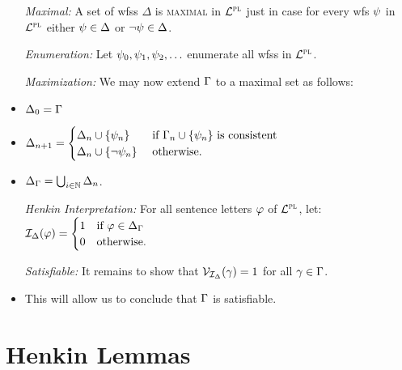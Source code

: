 \documentclass[a4paper, 11pt]{article} %
\begin{document}
\begin{itemize}
  \item[\it Maximal:] A set of wfss $\Delta$ is \textsc{maximal} in $\mathcal{L}^{\textsc{pl}}$ just in case for every wfs $\psi$ in $\mathcal{L}^{\textsc{pl}}$ either $\psi\in\Delta$ or $\neg\psi\in\Delta$.
  \item[\it Enumeration:] Let $\psi_0,\psi_1,\psi_2,\ldots$ enumerate all wfss in $\mathcal{L}^{\textsc{pl}}$.
  \item[\it Maximization:] We may now extend $\Gamma$ to a maximal set as follows: 
    \item $\Delta_0 = \Gamma$
    \item $\Delta_{n+1} =
      \begin{cases}
        \Delta_n\cup\lbrace\psi_n\rbrace      & \text{ if } \Gamma_n\cup\lbrace\psi_n\rbrace \text{ is consistent}\\
        \Delta_n\cup\lbrace\neg\psi_n\rbrace  & \text{ otherwise}.
      \end{cases}$
    \item $\Delta_{\Gamma} = \bigcup_{i\in\mathbb{N}}\Delta_n$. 
  \item[\it Henkin Interpretation:] For all sentence letters $\varphi$ of $\mathcal{L}^{\textsc{pl}}$, let:~~ $\mathcal{I}_{\Delta}(\varphi) = 
    \begin{cases}
      1 & \text{if } \varphi \in \Delta_{\Gamma}\\
      0 & \text{otherwise.}
    \end{cases}$
  \item[\it Satisfiable:] It remains to show that $\mathcal{V}_{\mathcal{I}_{\Delta}}(\gamma) = 1$ for all $\gamma \in \Gamma$. 
    \item This will allow us to conclude that $\Gamma$ is satisfiable.  
\end{itemize}





\section*{Henkin Lemmas}
\end{document}
